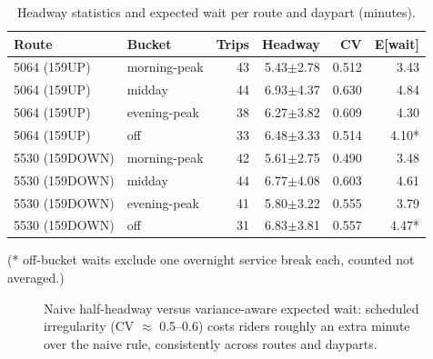 \documentclass[11pt,a4paper]{article}
\begin{document}
\begin{table}[H]
\centering
\caption{Headway statistics and expected wait per route and daypart (minutes).}
\label{tab:headways}
\begin{tabular}{@{}llrrrr@{}}
\toprule
Route & Bucket & Trips & Headway & CV & E[wait] \\
\midrule
5064 (159UP) & morning-peak & 43 & 5.43$\pm$2.78 & 0.512 & 3.43 \\
5064 (159UP) & midday & 44 & 6.93$\pm$4.37 & 0.630 & 4.84 \\
5064 (159UP) & evening-peak & 38 & 6.27$\pm$3.82 & 0.609 & 4.30 \\
5064 (159UP) & off & 33 & 6.48$\pm$3.33 & 0.514 & 4.10* \\
5530 (159DOWN) & morning-peak & 42 & 5.61$\pm$2.75 & 0.490 & 3.48 \\
5530 (159DOWN) & midday & 44 & 6.77$\pm$4.08 & 0.603 & 4.61 \\
5530 (159DOWN) & evening-peak & 41 & 5.80$\pm$3.22 & 0.555 & 3.79 \\
5530 (159DOWN) & off & 31 & 6.83$\pm$3.81 & 0.557 & 4.47* \\
\bottomrule
\end{tabular}
\end{table}

(* off-bucket waits exclude one overnight service break each, counted not averaged.)

\begin{figure}[H]
\centering
{}
\caption{Naive half-headway versus variance-aware expected wait: scheduled irregularity (CV $\approx$ 0.5--0.6) costs riders roughly an extra minute over the naive rule, consistently across routes and dayparts.}
\label{fig:waits}
\end{figure}
\end{document}
